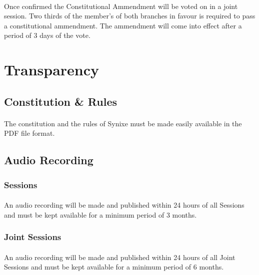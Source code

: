 \documentclass[10pt,a4paper]{article}
\begin{document}
\paragraph{}
Once confirmed the Constitutional Ammendment will be voted on in a joint session. Two thirds of the member's of both branches in favour is required to pass a constitutional ammendment. The ammendment will come into effect after a period of 3 days of the vote.
\section{Transparency}
\subsection{Constitution \& Rules}
\paragraph{}
The constitution and the rules of Synixe must be made easily available in the PDF file format.
\subsection{Audio Recording}
\subsubsection{Sessions}
\paragraph{}
An audio recording will be made and published within 24 hours of all Sessions and must be kept available for a minimum period of 3 months.
\subsubsection{Joint Sessions}
\paragraph{}
An audio recording will be made and published within 24 hours of all Joint Sessions and must be kept available for a minimum period of 6 months.
\end{document}
